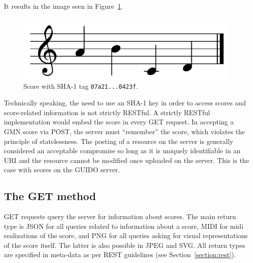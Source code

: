 \documentclass[11pt,a4paper]{article}
\begin{document}
It results in the image seen in Figure~\ref{fig:figure1}.
\begin{figure}[h]
  \centering
    \includegraphics[width=0.6\columnwidth]{figure1}
  \cprotect\caption{\label{fig:figure1}Score with SHA-1 tag \verb=07a21...0423f=.}
\end{figure}
Technically speaking, the need to use an SHA-1 key in order to access scores and score-related information is not strictly RESTful.  A strictly RESTful implementation would embed the score in every GET request. In accepting a GMN score via POST, the server must ``remember'' the score, which violates the principle of statelessness.  The posting of a resource on the server is generally considered an acceptable compromise \cite{richardson2008restful} so long as it is uniquely identifiable in an URI and the resource cannot be modified once uploaded on the server.  This is the case with scores on the GUIDO server.\par

\subsection{The GET method}\label{subsection:get}
GET requests query the server for information about scores. The main return type is JSON for all queries related to information about a score, MIDI for midi realizations of the score, and PNG for all queries asking for visual representations of the score itself.  The latter is also possible in JPEG and SVG.  All return types are specified in meta-data as per REST guidelines (see Section~\ref{section:rest}).\par
\end{document}
